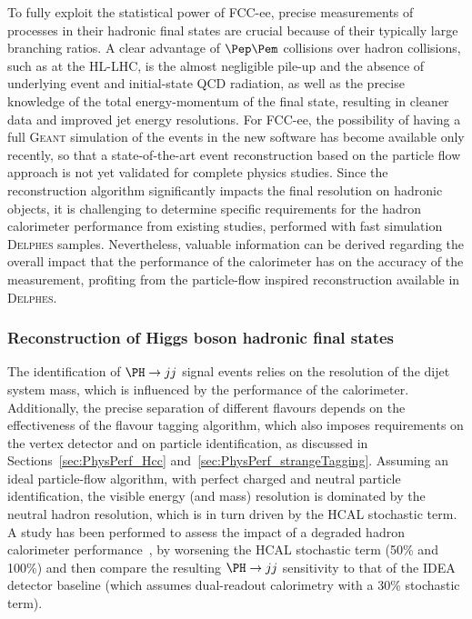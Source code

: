 To fully exploit the statistical power of FCC-ee, precise measurements of processes in their hadronic final states are crucial because of their typically large branching ratios. 
A clear advantage of $\epem$ collisions over hadron collisions, such as at the HL-LHC, 
is the almost negligible pile-up and the absence of underlying event and initial-state QCD radiation, 
as well as the precise knowledge of the total energy-momentum of the final state,
resulting in cleaner data and improved jet energy resolutions.
For FCC-ee, the possibility of having a full \textsc{Geant} simulation of the events in the new software has become available only recently, 
so that a state-of-the-art event reconstruction based on the particle flow approach is not yet validated for complete physics studies.  
Since the reconstruction algorithm significantly impacts the final resolution on hadronic objects, 
it is challenging to determine specific requirements for the hadron calorimeter performance from existing studies, performed with fast simulation \textsc{Delphes} samples. 
Nevertheless, valuable information can be derived regarding the overall impact that the performance of the calorimeter has on the accuracy of the measurement, 
profiting from the particle-flow inspired reconstruction available in \textsc{Delphes}.

\subsubsection{Reconstruction of Higgs boson hadronic final states}

The identification of $\PH \to jj$ signal events relies on the resolution of the dijet system mass, which is influenced by the performance of the calorimeter. 
Additionally, the precise separation of different flavours depends on the effectiveness of the flavour tagging algorithm, 
which also imposes requirements on the vertex detector and on particle identification, as discussed in Sections~\ref{sec:PhysPerf_Hcc} and~\ref{sec:PhysPerf_strangeTagging}. 
Assuming an ideal particle-flow algorithm, with perfect charged and neutral particle identification, 
the visible energy (and mass) resolution is dominated by the neutral hadron resolution, 
which is in turn driven by the HCAL stochastic term. 
A study has been performed to assess the impact of a degraded hadron calorimeter performance~\cite{sciandra_2024_gt813-z8602}, 
by worsening the HCAL stochastic term (50\% and 100\%) and then compare the resulting $\PH \to jj$ sensitivity to that of the IDEA detector baseline 
(which assumes dual-readout calorimetry with a 30\% stochastic term).

